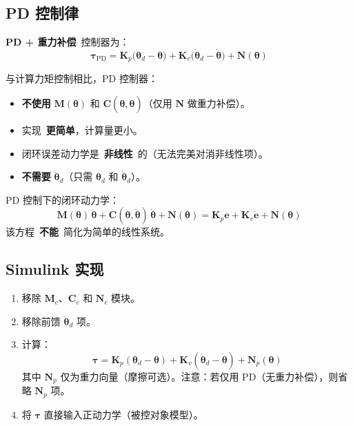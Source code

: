 \documentclass[12pt,a4paper]{ctexart}
\begin{document}
\subsection{PD 控制律}

\textbf{PD + 重力补偿}\ 控制器为：
\[
\boxed{\bm{\tau}_{\text{PD}} = \mathbf{K}_p\bigl(\bm{\theta}_d - \bm{\theta}\bigr) + \mathbf{K}_v\bigl(\dot{\bm{\theta}}_d - \dot{\bm{\theta}}\bigr) + \mathbf{N}(\bm{\theta})}
\]

与计算力矩控制相比，PD 控制器：
\begin{itemize}
  \item \textbf{不使用} $\mathbf{M}(\bm{\theta})$ 和 $\mathbf{C}(\bm{\theta},\dot{\bm{\theta}})$（仅用 $\mathbf{N}$ 做重力补偿）。
  \item 实现\ \textbf{更简单}，计算量更小。
  \item 闭环误差动力学是\ \textbf{非线性}\ 的（无法完美对消非线性项）。
  \item \textbf{不需要} $\ddot{\bm{\theta}}_d$（只需 $\bm{\theta}_d$ 和 $\dot{\bm{\theta}}_d$）。
\end{itemize}

PD 控制下的闭环动力学：
\[
\mathbf{M}(\bm{\theta})\,\ddot{\bm{\theta}} + \mathbf{C}(\bm{\theta},\dot{\bm{\theta}})\,\dot{\bm{\theta}} + \mathbf{N}(\bm{\theta}) = \mathbf{K}_p\mathbf{e} + \mathbf{K}_v\dot{\mathbf{e}} + \mathbf{N}(\bm{\theta})
\]
该方程\ \textbf{不能}\ 简化为简单的线性系统。

\subsection{Simulink 实现}

\begin{stepbox}
\begin{enumerate}
  \item 移除 $\mathbf{M}_c$、$\mathbf{C}_c$ 和 $\mathbf{N}_c$ 模块。
  \item 移除前馈 $\ddot{\bm{\theta}}_d$ 项。
  \item 计算：
  \[
  \bm{\tau} = \mathbf{K}_p(\bm{\theta}_d - \bm{\theta}) + \mathbf{K}_v(\dot{\bm{\theta}}_d - \dot{\bm{\theta}}) + \mathbf{N}_p(\bm{\theta})
  \]
  其中 $\mathbf{N}_p$ 仅为重力向量（摩擦可选）。注意：若仅用 PD（无重力补偿），则省略 $\mathbf{N}_p$ 项。
  \item 将 $\bm{\tau}$ 直接输入正动力学（被控对象模型）。
\end{enumerate}
\end{stepbox}
\end{document}
